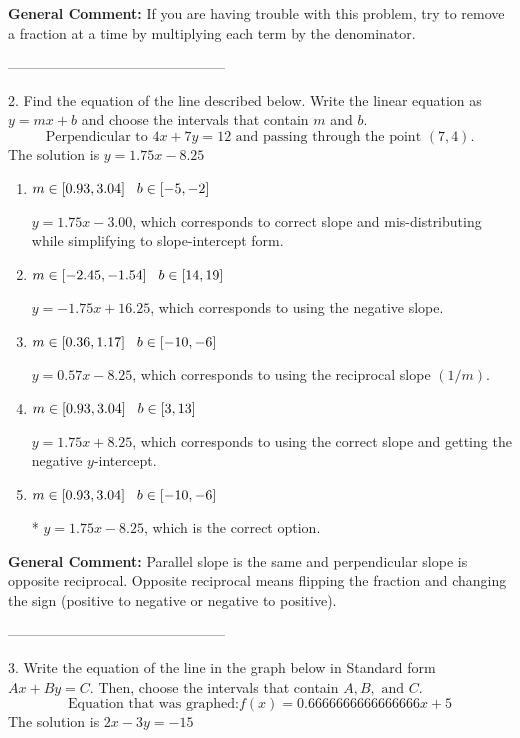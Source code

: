 \documentclass{extbook}[14pt]
\begin{document}
\textbf{General Comment:} If you are having trouble with this problem, try to remove a fraction at a time by multiplying each term by the denominator. 

-----------------------------------------------

2. Find the equation of the line described below. Write the linear equation as $ y=mx+b $ and choose the intervals that contain $m$ and $b$.
\[ \text{Perpendicular to } 4 x + 7 y = 12 \text{ and passing through the point } (7, 4). \] 
The solution is $ y = 1.75x - 8.25 $ 

\begin{enumerate}[label=\Alph*.] 
\item $ m \in [0.93, 3.04] \hspace*{3mm} b \in [-5, -2] $ 

  $y = 1.75x - 3.00$, which corresponds to correct slope and mis-distributing while simplifying to slope-intercept form. 
\item $ m \in [-2.45, -1.54] \hspace*{3mm} b \in [14, 19] $ 

  $y = -1.75x + 16.25$, which corresponds to using the negative slope. 
\item $ m \in [0.36, 1.17] \hspace*{3mm} b \in [-10, -6] $ 

  $y = 0.57x - 8.25$, which corresponds to using the reciprocal slope $(1/m)$. 
\item $ m \in [0.93, 3.04] \hspace*{3mm} b \in [3, 13] $ 

  $y = 1.75x + 8.25$, which corresponds to using the correct slope and getting the negative $y$-intercept. 
\item $ m \in [0.93, 3.04] \hspace*{3mm} b \in [-10, -6] $ 

 * $y = 1.75x - 8.25$, which is the correct option. 
\end{enumerate} 
 
\textbf{General Comment:} Parallel slope is the same and perpendicular slope is opposite reciprocal. Opposite reciprocal means flipping the fraction and changing the sign (positive to negative or negative to positive). 

-----------------------------------------------

3. Write the equation of the line in the graph below in Standard form $Ax+By=C$. Then, choose the intervals that contain $A, B, \text{ and } C$.
\[ \text{Equation that was graphed:} f(x)= 0.6666666666666666x + 5 \] 
The solution is $ 2x - 3y = -15 $ 
\end{document}
